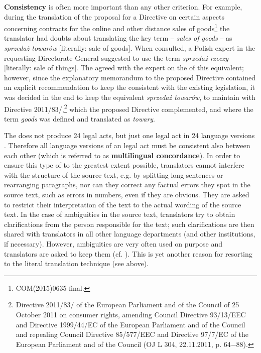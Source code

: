 \documentclass[output=paper]{langsci/langscibook}
\begin{document}
\textbf{Consistency} is often more important than any other criterion. For example, during the translation of the proposal for a Directive on certain aspects concerning contracts for the online and other distance sales of goods\footnote{COM(2015)0635 final.} the translator had doubts about translating the key term – \textit{sales of goods} – as \textit{sprzedaż towarów} [literally: sale of goods]. When consulted, a Polish expert in the requesting Directorate-General suggested to use the term \textit{sprzedaż rzeczy} [literally: sale of things]. The  agreed with the expert on the  of this equivalent; however, since the explanatory memorandum to the proposed Directive contained an explicit recommendation to keep the  consistent with the existing  legislation, it was decided in the end to keep the equivalent \textit{sprzedaż towarów}, to maintain  with Directive 2011/83/,\footnote{Directive 2011/83/ of the European Parliament and of the Council of 25 October 2011 on consumer rights, amending Council Directive 93/13/EEC and Directive 1999/44/EC of the European Parliament and of the Council and repealing Council Directive 85/577/EEC and Directive 97/7/EC of the European Parliament and of the Council (OJ L 304, 22.11.2011, p. 64$-$88).} which the proposed Directive complemented, and where the term \textit{goods} was defined and translated as \textit{towary}.

The  does not produce 24 legal acts, but just one legal act in 24 language versions \citep[119--120]{Doczekalska2009production}. Therefore all language versions of an  legal act must be consistent also between each other (which is referred to as \textbf{multilingual concordance}). In order to ensure this type of  to the greatest extent possible, translators cannot interfere with the structure of the source text, e.g. by splitting long sentences or rearranging paragraphs, nor can they correct any factual errors they spot in the source text, such as errors in numbers, even if they are obvious. They are asked to restrict their interpretation of the text to the actual wording of the source text. In the case of ambiguities in the source text, translators try to obtain clarifications from the person responsible for the text; such clarifications are then shared with translators in all other language departments (and other institutions, if necessary). However, ambiguities are very often used on purpose and translators are asked to keep them (cf. \citealt[92–93]{Šarčević1997}). This is yet another reason for resorting to the literal translation technique (see above).
\end{document}
